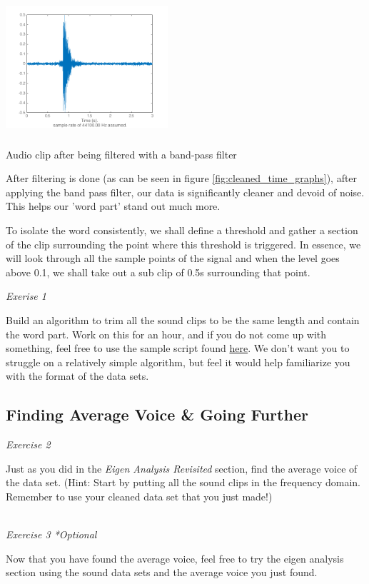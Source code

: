 \documentclass{tufte-handout}
\begin{document}
\begin{marginfigure}
	\includegraphics[width = 6cm, height = 5cm]{cleaned_time_2.png}
	\caption{Audio clip after being filtered with a band-pass filter}
	\label{fig:cleaned_time_graphs}
\end{marginfigure}
After filtering is done (as can be seen in figure \ref{fig:cleaned_time_graphs}), after applying the band pass filter, our data is significantly cleaner and devoid of noise. This helps our 'word part' stand out much more.

To isolate the word consistently, we shall define a threshold and gather a section of the clip surrounding the point where this threshold is triggered. In essence, we will look through all the sample points of the signal and when the level goes above 0.1, we shall take out a sub clip of 0.5s surrounding that point. 


\textit{Exerise 1}

Build an algorithm to trim all the sound clips to be the same length and contain the word part. Work on this for an hour, and if you do not come up with something, feel free to use the sample script found \href{#}{here}. We don't want you to struggle on a relatively simple algorithm, but feel it would help familiarize you with the format of the data sets. 

\subsection{Finding Average Voice & Going Further}
\textit{Exercise 2}

Just as you did in the \textit{Eigen Analysis Revisited} section, find the average voice of the data set. (Hint: Start by putting all the sound clips in the frequency domain. Remember to use your cleaned data set that you just made!)

\\
\textit{Exercise 3 *Optional}

Now that you have found the average voice, feel free to try the eigen analysis section using the sound data sets and the average voice you just found. 
\end{document}
